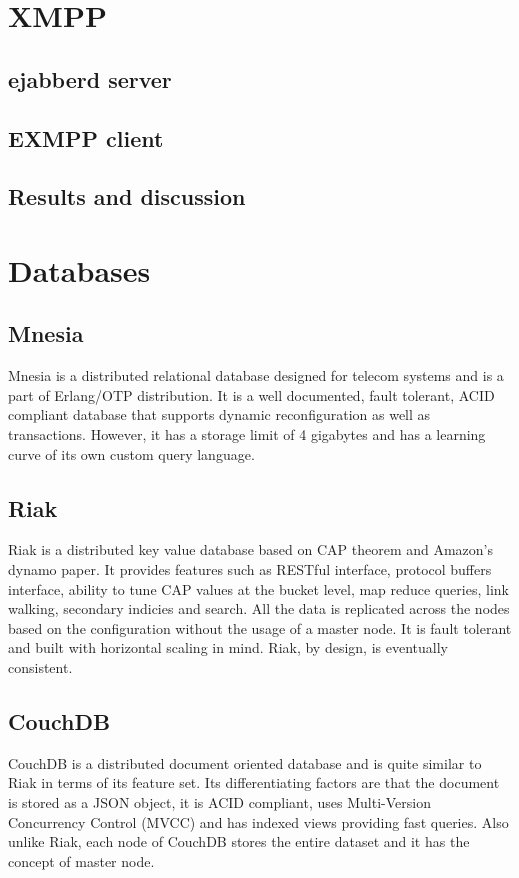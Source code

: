 \documentclass[11pt,a4paper]{report}
\begin{document}
\section{XMPP}
\subsection{ejabberd server}
\subsection{EXMPP client}
\subsection{Results and discussion}

\section{Databases}
\subsection{Mnesia}
Mnesia is a distributed relational database designed for telecom systems and is a part of Erlang/OTP distribution. It is a well documented, fault tolerant, ACID\cite{ACID} compliant database that supports dynamic reconfiguration as well as transactions. However, it has a storage limit of 4 gigabytes and has a learning curve of its own custom query language.

\subsection{Riak}
Riak is a distributed key value database based on CAP theorem\cite{cap_theorem} and Amazon's dynamo paper\cite{dynamo}. It provides features such as RESTful interface, protocol buffers interface, ability to tune CAP values at the bucket level, map reduce queries, link walking, secondary indicies and search. All the data is replicated across the nodes based on the configuration without the usage of a master node. It is fault tolerant and built with horizontal scaling in mind. Riak, by design, is eventually consistent.

\subsection{CouchDB}
CouchDB is a distributed document oriented database and is quite similar to Riak in terms of its feature set. Its differentiating factors are that the document is stored as a JSON object, it is ACID compliant, uses Multi-Version Concurrency Control (MVCC) and has indexed views providing fast queries. Also unlike Riak, each node of CouchDB stores the entire dataset and it has the concept of master node.
\end{document}

